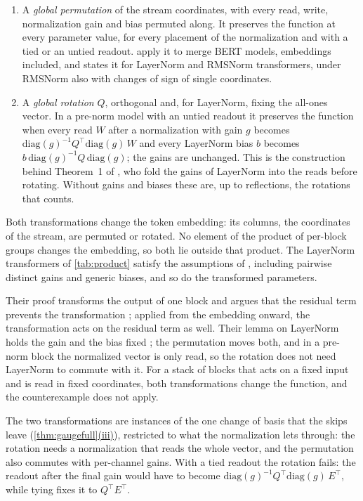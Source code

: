 \documentclass[10pt]{article}
\theoremstyle{definition}
\theoremstyle{remark}
\DeclareRobustCommand{\cpref}[2]{\hyperref[#1:#2]{\cref*{#1}(#2)}}
\begin{document}
\begin{enumerate}
\item A \emph{global permutation} of the stream coordinates, with every read, write, normalization gain and bias permuted along. It preserves the function at every parameter value, for every placement of the normalization and with a tied or an untied readout. \citet[Section~3.3]{verma2024merging} apply it to merge BERT models, embeddings included, and \citet[Theorem~2.1]{sweeney2026transport} states it for LayerNorm and RMSNorm transformers, under RMSNorm also with changes of sign of single coordinates.
\item A \emph{global rotation} $Q$, orthogonal and, for LayerNorm, fixing the all-ones vector. In a pre-norm model with an untied readout it preserves the function when every read $W$ after a normalization with gain $g$ becomes $\mathrm{diag}(g)^{-1}Q^\top\mathrm{diag}(g)\,W$ and every LayerNorm bias $b$ becomes $b\,\mathrm{diag}(g)^{-1}Q\,\mathrm{diag}(g)$; the gains are unchanged. This is the construction behind Theorem~1 of \citet{ashkboos2024slicegpt}, who fold the gains of LayerNorm into the reads before rotating. Without gains and biases these are, up to reflections, the rotations that \citet{vannierop2024gauge} counts.
\end{enumerate}
Both transformations change the token embedding: its columns, the coordinates of the stream, are permuted or rotated. No element of the product of per-block groups changes the embedding, so both lie outside that product. The LayerNorm transformers of \cref{tab:product} satisfy the assumptions of \citet{wang2025gauge}, including pairwise distinct gains and generic biases, and so do the transformed parameters.

Their proof transforms the output of one block and argues that the residual term prevents the transformation \citep[Theorem~30]{wang2025gauge}; applied from the embedding onward, the transformation acts on the residual term as well. Their lemma on LayerNorm holds the gain and the bias fixed \citep[Lemma~26]{wang2025gauge}; the permutation moves both, and in a pre-norm block the normalized vector is only read, so the rotation does not need LayerNorm to commute with it. For a stack of blocks that acts on a fixed input and is read in fixed coordinates, both transformations change the function, and the counterexample does not apply.

The two transformations are instances of the one change of basis that the skips leave (\cpref{thm:gaugefull}{iii}), restricted to what the normalization lets through: the rotation needs a normalization that reads the whole vector, and the permutation also commutes with per-channel gains. With a tied readout the rotation fails: the readout after the final gain would have to become $\mathrm{diag}(g)^{-1}Q^\top\mathrm{diag}(g)\,E^\top$, while tying fixes it to $Q^\top E^\top$.
\end{document}

